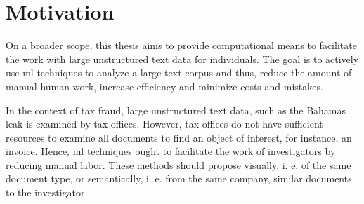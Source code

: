 \section{Motivation}\label{sec:motivation}

On a broader scope, this thesis aims to provide computational means to facilitate the work with large unstructured text data for individuals.
The goal is to actively use \ac{ml} techniques to analyze a large text corpus and thus, reduce the amount of manual human work, 
increase efficiency and minimize costs and mistakes.

In the context of tax fraud, large unstructured text data, such as the Bahamas leak is examined by tax offices.
However, tax offices do not have sufficient resources to examine all documents to find an object of interest, for instance, an invoice.
Hence, \ac{ml} techniques ought to facilitate the work of investigators by reducing manual labor.
These methods should propose visually, i. e. of the same document type, or semantically, i. e. from the same company, similar documents to the investigator.